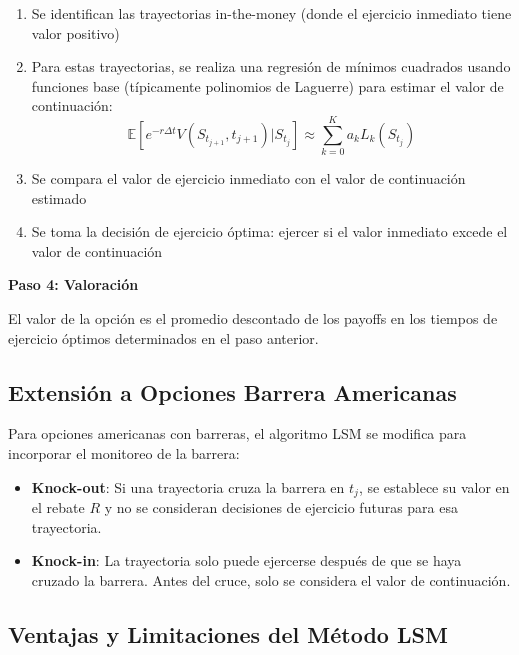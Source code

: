 \begin{enumerate}
    \item Se identifican las trayectorias in-the-money (donde el ejercicio inmediato tiene valor positivo)
    
    \item Para estas trayectorias, se realiza una regresión de mínimos cuadrados usando funciones base (típicamente polinomios de Laguerre) para estimar el valor de continuación:
    \begin{equation}
    \mathbb{E}[e^{-r\Delta t} V(S_{t_{j+1}}, t_{j+1}) | S_{t_j}] \approx \sum_{k=0}^{K} a_k L_k(S_{t_j})
    \end{equation}
    
    \item Se compara el valor de ejercicio inmediato con el valor de continuación estimado
    
    \item Se toma la decisión de ejercicio óptima: ejercer si el valor inmediato excede el valor de continuación
\end{enumerate}

\textbf{Paso 4: Valoración}

El valor de la opción es el promedio descontado de los payoffs en los tiempos de ejercicio óptimos determinados en el paso anterior.

\subsection{Extensión a Opciones Barrera Americanas}

Para opciones americanas con barreras, el algoritmo LSM se modifica para incorporar el monitoreo de la barrera:

\begin{itemize}
    \item \textbf{Knock-out}: Si una trayectoria cruza la barrera en $t_j$, se establece su valor en el rebate $R$ y no se consideran decisiones de ejercicio futuras para esa trayectoria.
    
    \item \textbf{Knock-in}: La trayectoria solo puede ejercerse después de que se haya cruzado la barrera. Antes del cruce, solo se considera el valor de continuación.
\end{itemize}

\subsection{Ventajas y Limitaciones del Método LSM}

